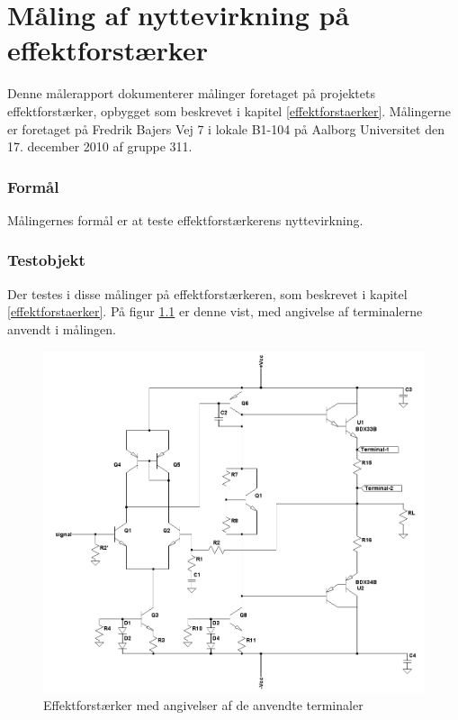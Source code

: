 \chapter{Måling af nyttevirkning på effektforstærker}
\label{maalejournal-nytte}

Denne målerapport dokumenterer målinger foretaget på projektets effektforstærker, opbygget som beskrevet i kapitel \ref{effektforstaerker}. Målingerne er foretaget på Fredrik Bajers Vej 7 i lokale B1-104 på Aalborg Universitet den 17. december 2010 af gruppe 311.

\subsection*{Formål}

Målingernes formål er at teste effektforstærkerens nyttevirkning.


\subsection*{Testobjekt}
Der testes i disse målinger på effektforstærkeren, som beskrevet i kapitel \ref{effektforstaerker}. På figur \ref{fig:testob_efforstaerker_nytte} er denne vist, med angivelse af terminalerne anvendt i målingen.

\begin{figure}[h]
\centering
\includegraphics[width=\textwidth]{maalerapporter/effektforstaerker/effektforstaerker_nyttevirkning_test.png}
\caption{Effektforstærker med angivelser af de anvendte terminaler}
\label{fig:testob_efforstaerker_nytte}
\end{figure}

